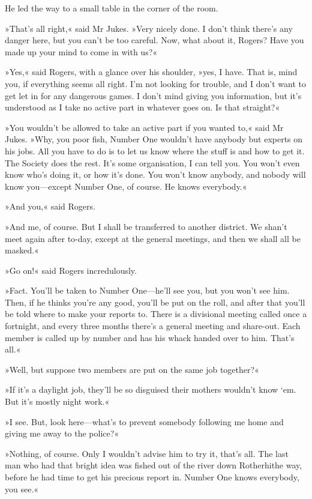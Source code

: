 He led the way to a small table in the corner of the room.

»That's all right,« said Mr Jukes. »Very nicely done. I don't think there's any danger here, but you can't be too careful. Now, what about it, Rogers? Have you made up your mind to come in with us?«

»Yes,« said Rogers, with a glance over his shoulder, »yes, I have. That is, mind you, if everything seems all right. I'm not looking for trouble, and I don't want to get let in for any dangerous games. I don't mind giving you information, but it's understood as I take no active part in whatever goes on. Is that straight?«

»You wouldn't be allowed to take an active part if you wanted to,« said Mr Jukes. »Why, you poor fish, Number One wouldn't have anybody but experts on his jobs. All you have to do is to let us know where the stuff is and how to get it. The Society does the rest. It's some organisation, I can tell you. You won't even know who's doing it, or how it's done. You won't know anybody, and nobody will know you—except Number One, of course. He knows everybody.«

»And you,« said Rogers.

»And me, of course. But I shall be transferred to another district. We shan't meet again after to-day, except at the general meetings, and then we shall all be masked.«

»Go on!« said Rogers incredulously.

»Fact. You'll be taken to Number One—he'll see you, but you won't see him. Then, if he thinks you're any good, you'll be put on the roll, and after that you'll be told where to make your reports to. There is a divisional meeting called once a fortnight, and every three months there's a general meeting and share-out. Each member is called up by number and has his whack handed over to him. That's all.«

»Well, but suppose two members are put on the same job together?«

»If it's a daylight job, they'll be so disguised their mothers wouldn't know `em. But it's mostly night work.«

»I see. But, look here—what's to prevent somebody following me home and giving me away to the police?«

»Nothing, of course. Only I wouldn't advise him to try it, that's all. The last man who had that bright idea was fished out of the river down Rotherhithe way, before he had time to get his precious report in. Number One knows everybody, you see.«

